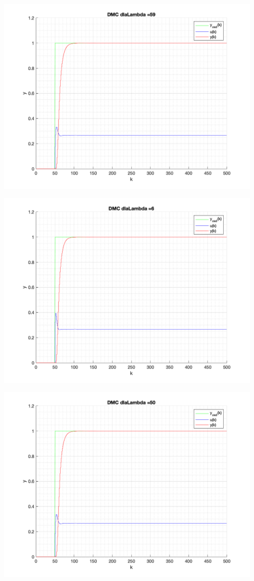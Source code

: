 \documentclass[a4paper, 11pt]{article}
\begin{document}
\begin{enumerate}
 \includegraphics[width=\linewidth]{./ModelsP4_Lambda/P4_DMC_Lambda_59_png.png} 
 
 \includegraphics[width=\linewidth]{./ModelsP4_Lambda/P4_DMC_Lambda_6_png.png} 
 
 \includegraphics[width=\linewidth]{./ModelsP4_Lambda/P4_DMC_Lambda_50_png.png} 
 

\end{enumerate}
\end{document}
